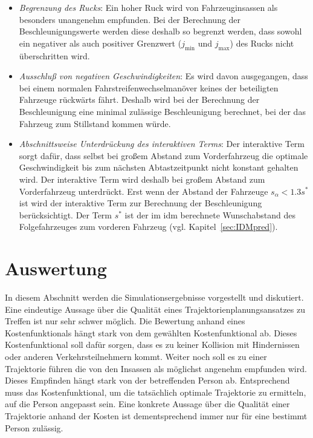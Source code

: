 \begin{itemize}


\item \textit{Begrenzung des Rucks}: Ein hoher Ruck wird von Fahrzeuginsassen als besonders unangenehm empfunden. 
Bei der Berechnung der Beschleunigungswerte werden diese deshalb so begrenzt werden, dass sowohl ein negativer als auch positiver Grenzwert (\(j_\mathrm{min}\) und \(j_\mathrm{max}\)) des Rucks nicht \"uberschritten wird.

\item \textit{Ausschlu{\ss} von negativen Geschwindigkeiten}: Es wird davon ausgegangen, dass bei einem normalen Fahrstreifenwechselman\"over keines der beteiligten Fahrzeuge r\"uckw\"arts f\"ahrt.
Deshalb wird bei der Berechnung der Beschleunigung eine minimal zul\"assige Beschleunigung berechnet, bei der das Fahrzeug zum Stillstand kommen w\"urde.

\item \textit{Abschnittsweise Unterdr\"uckung des interaktiven Terms}: Der interaktive Term sorgt daf\"ur, dass selbst bei gro{\ss}em Abstand zum Vorderfahrzeug die optimale Geschwindigkeit bis zum n\"achsten Abtastzeitpunkt nicht konstant gehalten wird.
Der interaktive Term wird deshalb bei gro{\ss}em Abstand zum Vorderfahrzeug unterdr\"uckt.
Erst wenn der Abstand der Fahrzeuge \( s_\alpha < 1.3 s^*\) ist wird der interaktive Term zur Berechnung der Beschleunigung ber\"ucksichtigt.
Der Term \(s^*\) ist der im \gls{idm} berechnete Wunschabstand des Folgefahrzeuges zum vorderen Fahrzeug (vgl. Kapitel~\ref{sec:IDMpred}).

\end{itemize}



\section{Auswertung}

In diesem Abschnitt werden die Simulationsergebnisse vorgestellt und diskutiert.
Eine eindeutige Aussage \"uber die Qualit\"at eines Trajektorienplanungsansatzes zu Treffen ist nur sehr schwer m\"oglich.
Die Bewertung anhand eines Kostenfunktionals h\"angt stark von dem gew\"ahlten Kostenfunktional ab.
Dieses Kostenfunktional soll daf\"ur sorgen, dass es zu keiner Kollision mit Hindernissen oder anderen Verkehrsteilnehmern kommt.
Weiter noch soll es zu einer Trajektorie f\"uhren die von den Insassen als m\"oglichst angenehm empfunden wird.
Dieses Empfinden h\"angt stark von der betreffenden Person ab.
Entsprechend muss das Kostenfunktional, um die tats\"achlich optimale Trajektorie zu ermitteln, auf die Person angepasst sein.
Eine konkrete Aussage \"uber die Qualit\"at einer Trajektorie anhand der Kosten ist dementsprechend immer nur f\"ur eine bestimmt Person zul\"assig.

